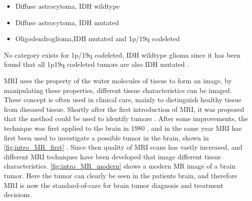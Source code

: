 \begin{itemize}
    \item Diffuse astrocytoma, \gls{IDH} wildtype
    \item Diffuse astrocytoma, \gls{IDH} mutated
    \item Oligodendroglioma,\gls{IDH} mutated and 1p/19q codeleted
\end{itemize}

No category exists for 1p/19q codeleted, \gls{IDH} wildtype glioma since it has been found that all 1p19q codeleted tumors are also IDH mutated \autocite{labussi20101p19qcodeletedIDH}.


\gls{MRI} uses the property of the water molecules of tissue to form an image, by manipulating these properties, different tissue characteristics can be imaged.
These concept is often used in clinical care, mainly to distinguish healthy tissue from diseased tissue.
Shortly after the first introduction of \gls{MRI}, it was proposed that the method could be used to identify tumors \autocite{damadian1971tumor}.
After some improvements, the technique was first applied to the brain in 1980 \autocite{holland1980brain}, and in the same year MRI has first been used to investigate a possible tumor in the brain, shown in \cref{fig:intro_MR_first} \autocite{hawkes1980NMRbrain}.
Since then quality of \gls{MRI} scans has vastly increased, and different \gls{MRI} techniques have been developed that image different tissue characteristics.
\cref{fig:intro_MR_modern} shows a modern \gls{MR} image of a brain tumor.
Here the tumor can clearly be seen in the patients brain, and therefore MRI is now the standard-of-care for brain tumor diagnosis and treatment decisions.

